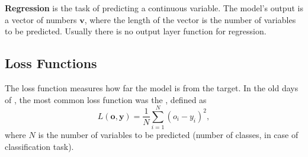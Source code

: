 \textbf{Regression} is the task of predicting a continuous variable.
The model's output is a vector of numbers $\pmb{v}$, where the length of the vector is the number of variables to be predicted.
Usually there is no output layer function for regression.


\subsection{Loss Functions}
\label{sec:loss_functions}
The loss function measures how far the model is from the target.
In the old days of \ml, the most common loss function was the \MSE, defined as 
\begin{equation}
    \label{eq:MSE}
    L(\pmb{o},\pmb{y}) = \frac{1}{N} \sum_{i=1}^N (o_i - y_i)^2,
\end{equation}
where $N$ is the number of variables to be predicted (number of classes, in case of classification task).

